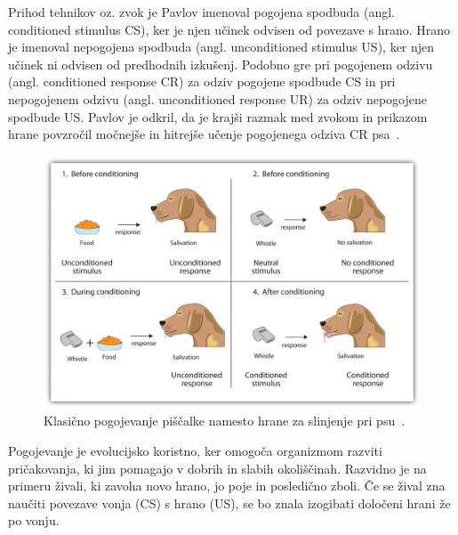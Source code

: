 \documentclass[a4paper, oneside, 12pt]{report}
\begin{document}
Prihod tehnikov oz. zvok je Pavlov imenoval pogojena spodbuda (angl. conditioned stimulus CS), ker je njen učinek odvisen od povezave s hrano. Hrano je imenoval nepogojena spodbuda (angl. unconditioned stimulus US), ker njen učinek ni odvisen od predhodnih izkušenj. Podobno gre pri pogojenem odzivu (angl. conditioned response CR) za odziv pogojene spodbude CS in pri nepogojenem odzivu (angl. unconditioned response UR) za odziv nepogojene spodbude US. Pavlov je odkril, da je krajši razmak med zvokom in prikazom hrane povzročil močnejše in hitrejše učenje pogojenega odziva CR psa~\cite{PsychologyAStudentFriendlyApproach}.

\begin{figure}[htbp]
\begin{center}
\includegraphics[scale=0.226]{WhistleAndDog.jpg}
\caption{Klasično pogojevanje piščalke namesto hrane za slinjenje pri psu~\cite{IntroductionToPsychology}.}
\label{figure:WhistleAndDog}
\end{center}
\end{figure}

Pogojevanje je evolucijsko koristno, ker omogoča organizmom razviti pričakovanja, ki jim pomagajo v dobrih in slabih okoliščinah. Razvidno je na primeru živali, ki zavoha novo hrano, jo poje in posledično zboli. Če se žival zna naučiti povezave vonja (CS) s hrano (US), se bo znala izogibati določeni hrani že po vonju.

\end{document}
